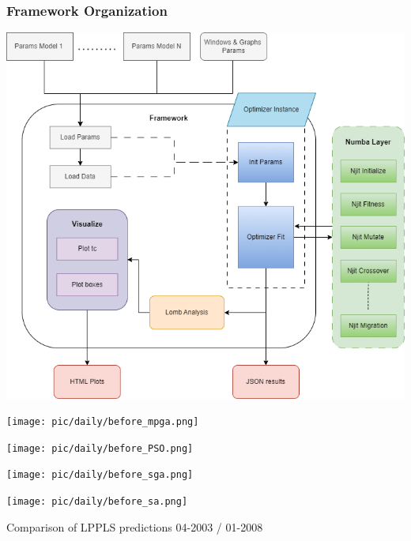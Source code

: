 \documentclass{beamer}
\begin{document}
\begin{frame}
\frametitle{Framework Organization}
    \begin{center}
        \includegraphics[scale=0.33]{pic/Framework.png}
    \end{center}
\end{frame}

\begin{frame}[h!]
    \centering
    \begin{minipage}[b]{0.45\textwidth}
        \centering
        \texttt{[image: pic/daily/before\_mpga.png]}
    \end{minipage}
    \hfill
    \begin{minipage}[b]{0.45\textwidth}
        \centering
        \texttt{[image: pic/daily/before\_PSO.png]}
    \end{minipage}

    \vspace{0.5cm} %

    \begin{minipage}[b]{0.45\textwidth}
        \centering
        \texttt{[image: pic/daily/before\_sga.png]}
    \end{minipage}
    \hfill
    \begin{minipage}[b]{0.45\textwidth}
        \centering
        \texttt{[image: pic/daily/before\_sa.png]}
    \end{minipage}

    \caption{Comparison of LPPLS predictions 04-2003 / 01-2008}
\end{frame}
\end{document}
